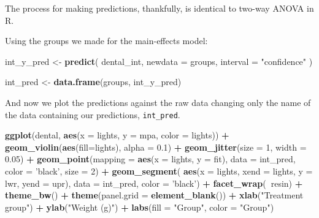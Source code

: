 \documentclass[
]{book}
\newenvironment{Shaded}{\begin{snugshade}}{\end{snugshade}}
\newcommand{\DataTypeTok}[1]{\textcolor[rgb]{0.13,0.29,0.53}{#1}}
\newcommand{\DecValTok}[1]{\textcolor[rgb]{0.00,0.00,0.81}{#1}}
\newcommand{\FloatTok}[1]{\textcolor[rgb]{0.00,0.00,0.81}{#1}}
\newcommand{\KeywordTok}[1]{\textcolor[rgb]{0.13,0.29,0.53}{\textbf{#1}}}
\newcommand{\NormalTok}[1]{#1}
\newcommand{\OperatorTok}[1]{\textcolor[rgb]{0.81,0.36,0.00}{\textbf{#1}}}
\newcommand{\StringTok}[1]{\textcolor[rgb]{0.31,0.60,0.02}{#1}}
\begin{document}
The process for making predictions, thankfully, is identical to two-way ANOVA in R.

Using the groups we made for the main-effects model:

\begin{Shaded}
\begin{Highlighting}[]
\NormalTok{int_y_pred <-}\StringTok{ }\KeywordTok{predict}\NormalTok{(}
\NormalTok{  dental_int, }\DataTypeTok{newdata =}\NormalTok{ groups, }\DataTypeTok{interval =} \StringTok{"confidence"}
\NormalTok{  )}

\NormalTok{int_pred <-}\StringTok{ }\KeywordTok{data.frame}\NormalTok{(groups, int_y_pred)}
\end{Highlighting}
\end{Shaded}

And now we plot the predictions against the raw data changing only the name of the data containing our predictions, \texttt{int\_pred}.

\begin{Shaded}
\begin{Highlighting}[]
\KeywordTok{ggplot}\NormalTok{(dental, }\KeywordTok{aes}\NormalTok{(}\DataTypeTok{x =}\NormalTok{ lights, }\DataTypeTok{y =}\NormalTok{ mpa, }\DataTypeTok{color =}\NormalTok{ lights)) }\OperatorTok{+}
\StringTok{  }\KeywordTok{geom_violin}\NormalTok{(}\KeywordTok{aes}\NormalTok{(}\DataTypeTok{fill=}\NormalTok{lights), }\DataTypeTok{alpha =} \FloatTok{0.1}\NormalTok{) }\OperatorTok{+}
\StringTok{  }\KeywordTok{geom_jitter}\NormalTok{(}\DataTypeTok{size =} \DecValTok{1}\NormalTok{, }\DataTypeTok{width =} \FloatTok{0.05}\NormalTok{) }\OperatorTok{+}
\StringTok{  }\KeywordTok{geom_point}\NormalTok{(}\DataTypeTok{mapping =} \KeywordTok{aes}\NormalTok{(}\DataTypeTok{x =}\NormalTok{ lights, }\DataTypeTok{y =}\NormalTok{ fit), }
             \DataTypeTok{data =}\NormalTok{ int_pred,}
             \DataTypeTok{color =} \StringTok{'black'}\NormalTok{,}
             \DataTypeTok{size =} \DecValTok{2}\NormalTok{) }\OperatorTok{+}
\StringTok{  }\KeywordTok{geom_segment}\NormalTok{(}
    \KeywordTok{aes}\NormalTok{(}\DataTypeTok{x =}\NormalTok{ lights, }\DataTypeTok{xend =}\NormalTok{ lights, }\DataTypeTok{y =}\NormalTok{ lwr, }\DataTypeTok{yend =}\NormalTok{ upr),}
    \DataTypeTok{data =}\NormalTok{ int_pred,}
    \DataTypeTok{color =} \StringTok{'black'}\NormalTok{) }\OperatorTok{+}\StringTok{  }
\StringTok{  }\KeywordTok{facet_wrap}\NormalTok{(}\OperatorTok{~}\NormalTok{resin) }\OperatorTok{+}
\StringTok{  }\KeywordTok{theme_bw}\NormalTok{() }\OperatorTok{+}
\StringTok{  }\KeywordTok{theme}\NormalTok{(}\DataTypeTok{panel.grid =} \KeywordTok{element_blank}\NormalTok{()) }\OperatorTok{+}
\StringTok{  }\KeywordTok{xlab}\NormalTok{(}\StringTok{"Treatment group"}\NormalTok{) }\OperatorTok{+}
\StringTok{  }\KeywordTok{ylab}\NormalTok{(}\StringTok{"Weight (g)"}\NormalTok{) }\OperatorTok{+}
\StringTok{  }\KeywordTok{labs}\NormalTok{(}\DataTypeTok{fill =} \StringTok{"Group"}\NormalTok{, }\DataTypeTok{color =} \StringTok{"Group"}\NormalTok{)}
\end{Highlighting}
\end{Shaded}
\end{document}
